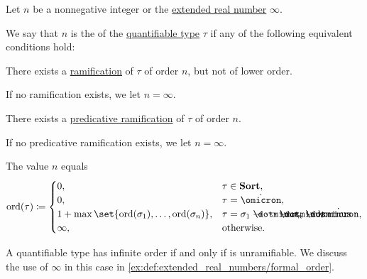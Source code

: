 \begin{definition}\label{def:quantifiable_type_ramification_order}\mimprovised
  Let \( n \) be a nonnegative integer or the \hyperref[def:extended_real_numbers]{extended real number} \( \infty \).

  We say that \( n \) is the  of the \hyperref[def:hol_signature/universes/quant]{quantifiable type} \( \tau \) if any of the following equivalent conditions hold:
  \begin{thmenum}
     There exists a \hyperref[def:ramified_theory_of_types/ramified_type]{ramification} of \( \tau \) of order \( n \), but not of lower order.

    If no ramification exists, we let \( n = \infty \).

     There exists a \hyperref[def:ramified_theory_of_types/predicativity]{predicative ramification} of \( \tau \) of order \( n \).

    If no predicative ramification exists, we let \( n = \infty \).

     The value \( n \) equals
    \begin{equation}\label{eq:def:quantifiable_type_ramification_order/direct}
      \ord(\tau) \coloneqq \begin{cases}
        0,                                                      &\tau \in \op*{Sort}, \\
        0,                                                      &\tau = \syn\omicron, \\
        1 + \max\set{ \ord(\sigma_1), \ldots, \ord(\sigma_n) }, &\tau = \sigma_1 \synimplies \cdots \synimplies \sigma_n \synimplies \syn\omicron, \\
        \infty,                                                 &\T{otherwise.}
      \end{cases}
    \end{equation}
  \end{thmenum}
\end{definition}
\begin{comments}
  \item A quantifiable type has infinite order if and only if is unramifiable. We discuss the use of \( \infty \) in this case in \cref{ex:def:extended_real_numbers/formal_order}.
\end{comments}
